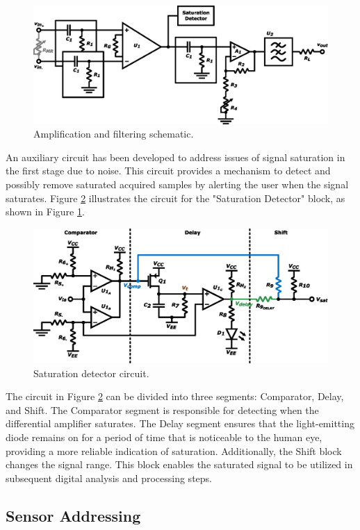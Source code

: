 \begin{figure}[!ht]
    \centering
    \includegraphics[width=.475\textwidth]{figs/amp.eps}
    \caption{Amplification and filtering schematic.}
    \label{fig:amp-schematic}
\end{figure}


An auxiliary circuit has been developed to address issues of signal saturation in the first stage due to noise. This circuit provides a mechanism to detect and possibly remove saturated acquired samples by alerting the user when the signal saturates. Figure \ref{fig:sat} illustrates the circuit for the "Saturation Detector" block, as shown in Figure \ref{fig:amp-schematic}. 

\begin{figure}[!ht]
    \centering
    \includegraphics[width=.475\textwidth]{figs/sat.eps}
    \caption{Saturation detector circuit.}
    \label{fig:sat}
\end{figure}

The circuit in Figure \ref{fig:sat} can be divided into three segments: Comparator, Delay, and Shift. The Comparator segment is responsible for detecting when the differential amplifier saturates. The Delay segment ensures that the light-emitting diode remains on for a period of time that is noticeable to the human eye, providing a more reliable indication of saturation. Additionally, the Shift block changes the signal range. This block enables the saturated signal to be utilized in subsequent digital analysis and processing steps.

\subsection{Sensor Addressing}

